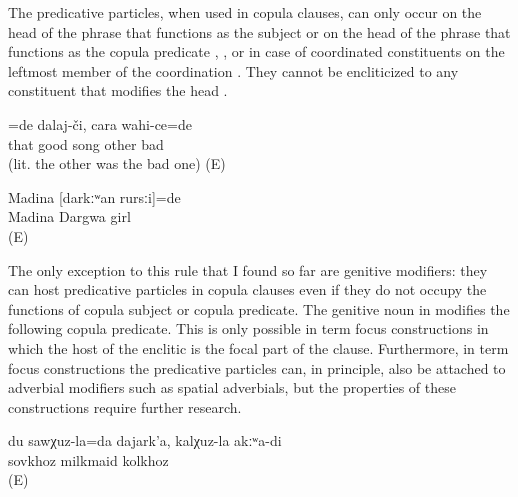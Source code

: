 The predicative particles, when used in copula clauses, can only occur on the head of the phrase that functions as the subject  or on the head of the phrase that functions as the copula predicate , , or in case of coordinated constituents on the leftmost member of the coordination . They cannot be encliticized to any constituent that modifies the head . 
%
\begin{exe}
	\ex	\label{ex:‎The good one was a singer, not the bad one}
	\gll	[it	ʡaˁħ-ce]=de	dalaj-či,	cara	wahi-ce=de\\
		that	good	song	other	bad\\
	\glt	{} (lit. the other was the bad one) (E)

	\ex	\label{ex:‎‎‎Madina was a Dargwa girl}
	\begin{xlist}
		\ex	\label{ex:‎‎‎Madina was a Dargwa girl@A}
		\gll	Madina	[darkːʷan	rursːi]=de\\
			Madina	Dargwa	girl\\
		\glt	{} (E)

		 \label{ex:‎‎‎Madina was a Dargwa girl@B}
	\end{xlist}
\end{exe}

The only exception to this rule that I found so far are genitive modifiers: they can host predicative particles in copula clauses even if they do not occupy the functions of copula subject or copula predicate. The genitive noun in  modifies the following copula predicate. This is only possible in term focus constructions in which the host of the enclitic is the focal part of the clause. Furthermore, in term focus constructions the predicative particles can, in principle, also be attached to adverbial modifiers such as spatial adverbials, but the properties of these constructions require further research.
%
\begin{exe}
	\ex	\label{ex:‎I am milkmaid of the SOVKHOZ, not of the kolkhoz}
	\gll	du	sawχuz-la=da	dajark'a,	kalχuz-la	akːʷa-di\\
			sovkhoz	milkmaid	kolkhoz	\\
	\glt	{} (E)
\end{exe}

